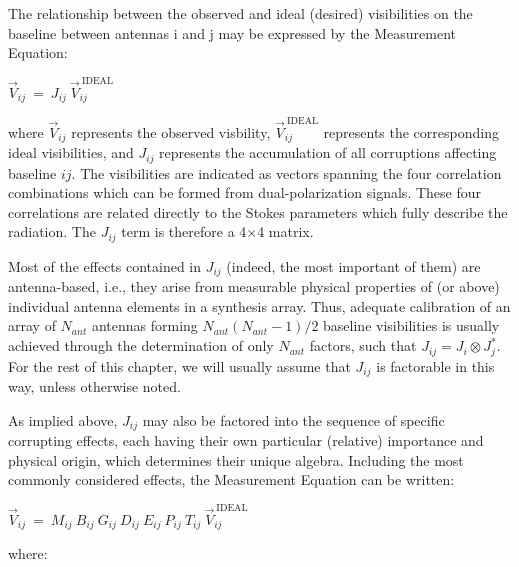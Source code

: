 The relationship between the observed and ideal (desired) visibilities
on the baseline between antennas i and j may be expressed by the
Measurement Equation: 

$\vec{V}_{ij}~=~J_{ij}~\vec{V}_{ij}^{\mathrm{~IDEAL}}$

where $\vec{V}_{ij}$ represents the observed visbility,
$\vec{V}_{ij}^{\mathrm{~IDEAL}}$ represents the corresponding ideal
visibilities, and $J_{ij}$ represents the accumulation of all
corruptions affecting baseline $ij$. The visibilities are indicated as
vectors spanning the four correlation combinations which can be formed
from dual-polarization signals. These four correlations are related
directly to the Stokes parameters which fully describe the
radiation. The $J_{ij}$ term is therefore a 4$\times$4 matrix. 

Most of the effects contained in $J_{ij}$ (indeed, the most important
of them) are antenna-based, i.e., they arise from measurable physical
properties of (or above) individual antenna elements in a synthesis
array. Thus, adequate calibration of an array of $N_{ant}$ antennas
forming $N_{ant}(N_{ant}-1)/2$ baseline visibilities is usually
achieved through the determination of only $N_{ant}$ factors, such
that $J_{ij} = J_i \otimes J_j^{*}$. For the rest of this chapter, we
will usually assume that $J_{ij}$ is factorable in this way, unless
otherwise noted. 

As implied above, $J_{ij}$ may also be factored into the sequence of
specific corrupting effects, each having their own particular
(relative) importance and physical origin, which determines their
unique algebra. Including the most commonly considered effects, the
Measurement Equation can be written: 

$\vec{V}_{ij}~=~M_{ij}~B_{ij}~G_{ij}~D_{ij}~E_{ij}~P_{ij}~T_{ij}~\vec{V}_{ij}^{\mathrm{~IDEAL}}$   

where:

